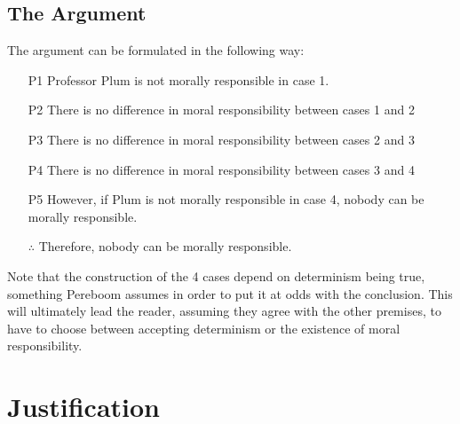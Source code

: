 \documentclass{article}
\begin{document}
\subsection{The Argument}
The argument can be formulated in the following way:

\begin{enumerate}
    \item[P1] Professor Plum is not morally responsible in case 1.
    \item[P2] There is no difference in moral responsibility between cases 1 and 2
    \item[P3] There is no difference in moral responsibility between cases 2 and 3
    \item[P4] There is no difference in moral responsibility between cases 3 and 4
    \item[P5] However, if Plum is not morally responsible in case 4, nobody can be morally responsible.
    \item[$\therefore$] Therefore, nobody can be morally responsible.
\end{enumerate}

Note that the construction of the 4 cases depend on determinism being true, something Pereboom assumes in order to put it at odds with the conclusion. This will ultimately lead the reader, assuming they agree with the other premises, to have to choose between accepting determinism or the existence of moral responsibility.

\section{Justification}
\end{document}
